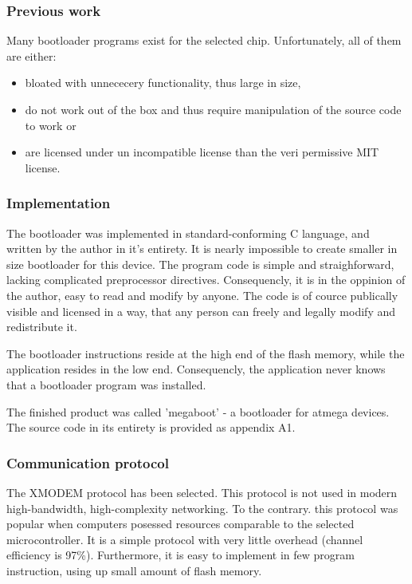 \subsubsection{Previous work}
Many bootloader programs exist for the selected chip.
Unfortunately, all of them are either:
\begin{itemize}
\item{bloated with unnececery functionality, thus large in size,}
\item{do not work out of the box and thus require manipulation of the source code to work or}
\item{are licensed under un incompatible license than the veri permissive MIT license.}
\end{itemize}

\subsubsection{Implementation}
The bootloader was implemented in standard-conforming C language, and written by the author in it's entirety.
It is nearly impossible to create smaller in size bootloader for this device.
The program code is simple and straighforward, lacking complicated preprocessor directives.
Consequencly, it is in the oppinion of the author, easy to read and modify by anyone.
The code is of cource publically visible and licensed in a way, that any person can freely and legally modify and redistribute it.
\par
The bootloader instructions reside at the high end of the flash memory, while the application resides in the low end.
Consequencly, the application never knows that a bootloader program was installed.
\par
The finished product was called 'megaboot' - a bootloader for atmega devices.
The source code in its entirety is provided as appendix A1.

\subsubsection{Communication protocol}
The XMODEM protocol has been selected.
This protocol is not used in modern high-bandwidth, high-complexity networking.
To the contrary. this protocol was popular when computers posessed resources comparable to the selected microcontroller.
It is a simple protocol with very little overhead (channel efficiency is 97\%).
Furthermore, it is easy to implement in few program instruction, using up small amount of flash memory.

